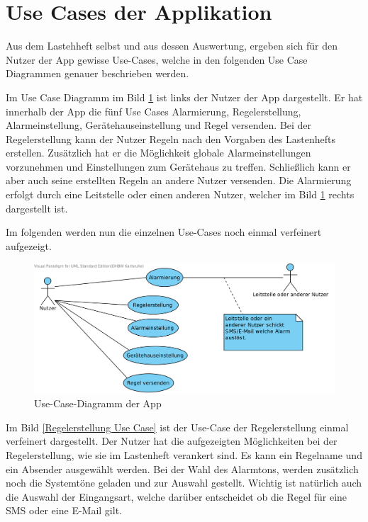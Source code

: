 \section{Use Cases der Applikation}
\label{Use Case Diagramme}
Aus dem Lastehheft selbst und aus dessen Auswertung, ergeben sich f\"ur den Nutzer der App gewisse Use-Cases, welche in den folgenden Use Case Diagrammen genauer beschrieben werden.

Im Use Case Diagramm im Bild \ref{Main Use Case} ist links der Nutzer der App dargestellt. Er hat innerhalb der App die f\"unf Use Cases Alarmierung, Regelerstellung, Alarmeinstellung, Ger\"atehauseinstellung und Regel versenden. Bei der Regelerstellung kann der Nutzer Regeln nach den Vorgaben des Lastenhefts erstellen. Zus\"atzlich hat er die M\"oglichkeit globale Alarmeinstellungen vorzunehmen und Einstellungen zum Ger\"atehaus zu treffen. Schlie\ss{}lich kann er aber auch seine erstellten Regeln an andere Nutzer versenden. 
Die Alarmierung erfolgt durch eine Leitstelle oder einen anderen Nutzer, welcher im Bild \ref{Main Use Case} rechts dargestellt ist.

Im folgenden werden nun die einzelnen Use-Cases noch einmal verfeinert aufgezeigt.
\begin{figure}[!ht]
\centering
\includegraphics[width=16cm]{Bilder/AlarmSMS_App.png}
\caption{Use-Case-Diagramm der App}
\label{Main Use Case}
\centering
\end{figure}

Im Bild \ref{Regelerstellung Use Case} ist der Use-Case der Regelerstellung einmal verfeinert dargestellt. Der Nutzer hat die aufgezeigten M\"oglichkeiten bei der Regelerstellung, wie sie im Lastenheft verankert sind. Es kann ein Regelname und ein Absender ausgew\"ahlt werden. Bei der Wahl des Alarmtons, werden zus\"atzlich noch die Systemt\"one geladen und zur Auswahl gestellt. Wichtig ist nat\"urlich auch die Auswahl der Eingangsart, welche dar\"uber entscheidet ob die Regel f\"ur eine SMS oder eine E-Mail gilt. 

